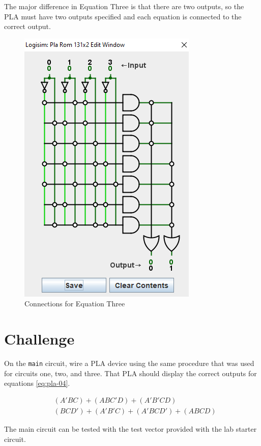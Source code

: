 The major difference in Equation Three is that there are two outputs, so the \ac{PLA} must have two outputs specified and each equation is connected to the correct output.

\begin{figure}[H]
	\centering
	\includegraphics[width=\maxwidth{.95\linewidth}]{gfx/pla-07}
	\caption{Connections for Equation Three}
	\label{fig:pla-08}
\end{figure}

\section{Challenge}

On the \lstinline[columns=fixed]|main| circuit, wire a \ac{PLA} device using the same procedure that was used for circuits one, two, and three. That \ac{PLA} should display the correct outputs for equations \ref{eq:pla-04}.

\begin{align}
	\label{eq:pla-04}
	&(A'BC)+(ABC'D)+(A'B'CD) \\
	\nonumber
	&(BCD')+(A'B'C)+(A'BCD')+(ABCD)
\end{align}

The main circuit can be tested with the test vector provided with the lab starter circuit.


